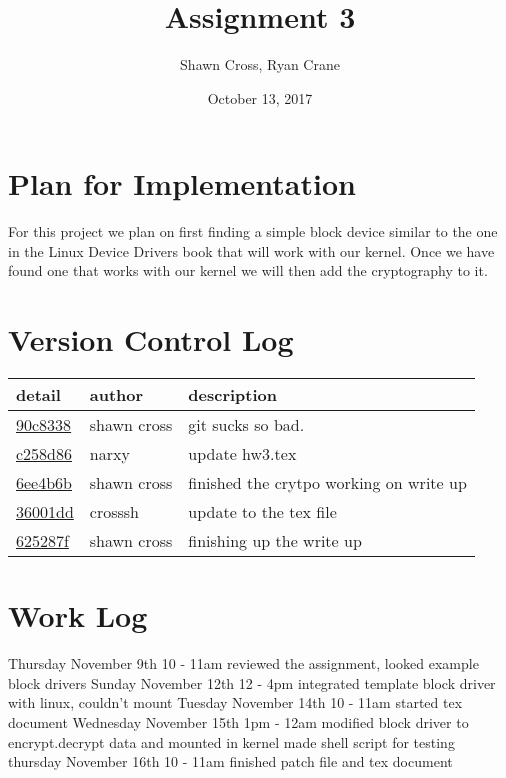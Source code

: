 \documentclass[letterpaper,10pt,titlepage]{article}
\begin{document}
\title{Assignment 3}
\date{October 13, 2017}
\author{Shawn Cross, Ryan Crane}
\maketitle

\section{Plan for Implementation}

For this project we plan on first finding a simple block device similar to the 
one in the Linux Device Drivers book that will work with our kernel. Once we 
have found one that works with our kernel we will then add the cryptography to 
it. 

\section{Version Control Log}
\begin{tabular}{l l l}\textbf{detail} & \textbf{author} & \textbf{description}\\\hline
\href{https://github.com/crosssh/cs444/commit/90c833816bad716ceedd20fe1b47ce2d5822b3e0}{90c8338} & shawn cross & git sucks so bad.\\\hline
\href{https://github.com/crosssh/cs444/commit/c258d8693943c8d485286b946f36b00db533652c}{c258d86} & narxy & update hw3.tex\\\hline
\href{https://github.com/crosssh/cs444/commit/6ee4b6b1f3698e604beb00abe07b3988e9ab4f29}{6ee4b6b} & shawn cross & finished the crytpo working on write up\\\hline
\href{https://github.com/crosssh/cs444/commit/36001ddeb5eecb218672829156a124c4a0971a8e}{36001dd} & crosssh & update to the tex file\\\hline
\href{https://github.com/crosssh/cs444/commit/625287fc9915eb508139598719b3c66a33ecc80e}{625287f} & shawn cross & finishing up the write up\\\hline\end{tabular}

\section{Work Log}
Thursday November 9th 10 - 11am 
reviewed the assignment, looked example block drivers
Sunday November 12th 12 - 4pm
integrated template block driver with linux, couldn't mount
Tuesday November 14th 10 - 11am
started tex document
Wednesday November 15th 1pm - 12am
modified block driver to encrypt.decrypt data and mounted in kernel
made shell script for testing
thursday November 16th 10 - 11am
finished patch file and tex document
\end{document}
